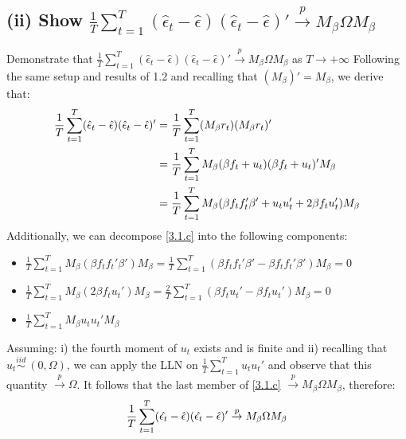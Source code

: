 \documentclass[]{article}
\begin{document}
\subsection*{(ii) Show $\frac{1}{T} \sum_{t=1}^{T} (\hat{\epsilon}_t - \hat{\epsilon})(\hat{\epsilon}_t - \hat{\epsilon})' \xrightarrow{p} M_{\beta} \Omega M_{\beta}$}
Demonstrate that $\frac{1}{T}\sum_{t=1}^{T}(\hat{\epsilon}_t-\hat{\epsilon})(\hat{\epsilon}_t-\hat{\epsilon})' \overset{p}{\to} M_\beta\Omega M_\beta$ as $T\to{+\infty}$
Following the same setup and results of 1.2 and recalling that $(M_\beta)' = M_\beta$, we derive that:
\begin{align} \label{3.1.c}
	\frac{1}{T}\sum_{t=1}^{T}(\hat{\epsilon}_t-\hat{\epsilon})(\hat{\epsilon}_t-\hat{\epsilon})' &= \frac{1}{T}\sum_{t=1}^{T}(M_\beta r_t)(M_\beta r_t)' \notag\\
	&= \frac{1}{T}\sum_{t=1}^{T} M_\beta(\beta f_t + u_t)(\beta f_t + u_t)'M_\beta \notag\\
	&= \frac{1}{T}\sum_{t=1}^{T}M_\beta (\beta f_t f_t' \beta' + u_t u_t' + 2\beta f_t u_t') M_\beta  
\end{align} 
Additionally, we can decompose \ref{3.1.c} into the following components:
\begin{itemize}
	\item $\frac{1}{T}\sum_{t=1}^{T}M_\beta(\beta f_t f_t' \beta') M_\beta = \frac{1}{T}\sum_{t=1}^{T}(\beta f_t f_t' \beta' - \beta f_t f_t' \beta')M_\beta = 0$ 
	\item $\frac{1}{T}\sum_{t=1}^{T}M_\beta(2\beta f_t u_t')M_\beta = \frac{2}{T}\sum_{t=1}^{T}(\beta f_t u_t'-\beta f_t u_t')M_\beta = 0$
	\item $\frac{1}{T}\sum_{t=1}^{T}M_\beta u_t u_t' M_\beta$
\end{itemize}
Assuming: i) the fourth moment of $u_t$ exists and is finite and ii) recalling that $u_t \overset{iid}{\sim} \: (0,\Omega)$, we can apply the LLN on $\frac{1}{T}\sum_{t=1}^{T} u_t u_t'$ and observe that this quantity $\overset{p}{\to} \Omega$.
It follows that the last member of \ref{3.1.c} $\overset{p}{\to} M_\beta \Omega M_\beta$, therefore:
\begin{align} \label{3.2.b}
	\frac{1}{T}\sum_{t=1}^{T}(\hat{\epsilon_t}-\hat{\epsilon})(\hat{\epsilon_t}-\hat{\epsilon})' \overset{p}{\to} M_\beta \Omega M_\beta \\ \notag 
\end{align}    
\end{document}
